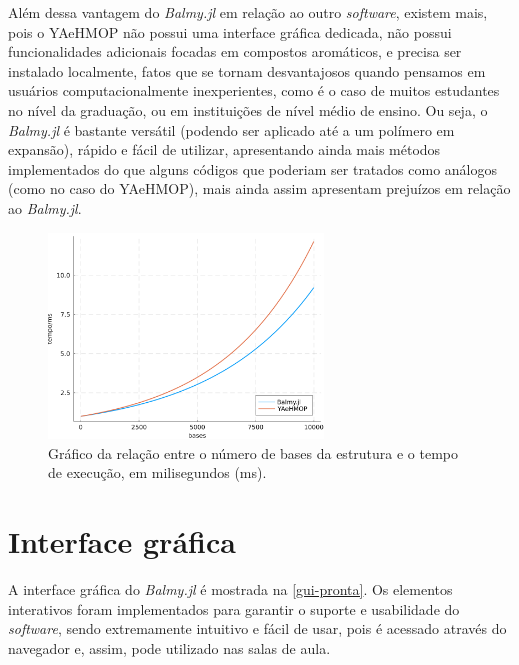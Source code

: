 Além dessa vantagem do \textit{Balmy.jl} em relação ao outro \textit{software}, existem mais, pois o \gls{YAeHMOP} não possui uma interface gráfica dedicada, não possui funcionalidades adicionais focadas em compostos aromáticos, e precisa ser instalado localmente, fatos que se tornam desvantajosos quando pensamos em usuários computacionalmente inexperientes, como é o caso de muitos estudantes no nível da graduação, ou em instituições de nível médio de ensino. Ou seja, o \textit{Balmy.jl} é bastante versátil (podendo ser aplicado até a um polímero em expansão), rápido e fácil de utilizar, apresentando ainda mais métodos implementados do que alguns códigos que poderiam ser tratados como análogos (como no caso do \gls{YAeHMOP}), mais ainda assim apresentam prejuízos em relação ao \textit{Balmy.jl}.

\begin{figure}[htb]
\caption{\label{fig:times} Gráfico da relação entre o número de bases da estrutura e o tempo de execução, em milisegundos (ms).}
	\begin{center}
		\includegraphics[width=0.65\textwidth]{images/tttt.png}
	\end{center}
\end{figure}


\section{Interface gráfica}\label{design}

A interface gráfica do \textit{Balmy.jl} é mostrada na \autoref{gui-pronta}. Os elementos interativos foram implementados para garantir o suporte e usabilidade do \textit{software}, sendo extremamente intuitivo e fácil de usar, pois é acessado através do navegador e, assim, pode utilizado nas salas de aula.

\newpage
 
